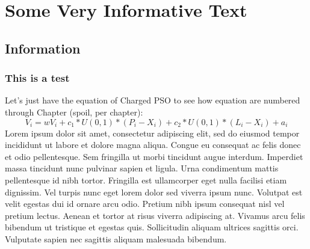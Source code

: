 \documentclass[../Thesis]{subfiles}
\begin{document}
\chapter{Some Very Informative Text}

{
\hypersetup{linkcolor=black}
\minitoc
}

\section{Information}
\subsection{This is a test}

Let's just have the equation of Charged PSO to see how equation are numbered through Chapter (spoil, per chapter):
\begin{equation} 
    V_{i} = wV_{i} + c_{1} * U(0,1) * (P_{i} - X_{i}) + c_{2} * U(0,1) * (L_{i} - X_{i}) + a_{i} \label{eqn:velocityChargedUpdate} 
\end{equation} 
Lorem ipsum dolor sit amet, consectetur adipiscing elit, sed do eiusmod tempor incididunt ut labore et dolore magna aliqua. Congue eu consequat ac felis donec et odio pellentesque. Sem fringilla ut morbi tincidunt augue interdum. Imperdiet massa tincidunt nunc pulvinar sapien et ligula. Urna condimentum mattis pellentesque id nibh tortor. Fringilla est ullamcorper eget nulla facilisi etiam dignissim. Vel turpis nunc eget lorem dolor sed viverra ipsum nunc. Volutpat est velit egestas dui id ornare arcu odio. Pretium nibh ipsum consequat nisl vel pretium lectus. Aenean et tortor at risus viverra adipiscing at. Vivamus arcu felis bibendum ut tristique et egestas quis. Sollicitudin aliquam ultrices sagittis orci. Vulputate sapien nec sagittis aliquam malesuada bibendum.
\end{document}

